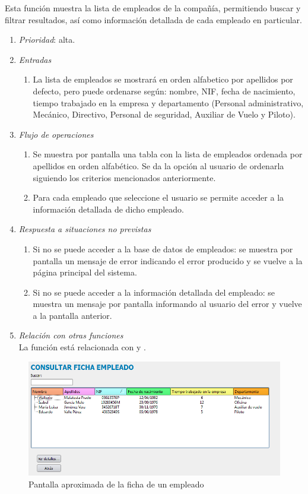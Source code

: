 

 \label{fun:consultarempleado}
	Esta función muestra la lista de empleados de la compañía, permitiendo buscar y filtrar resultados, así como información detallada de cada empleado en particular.
		
	\begin{enumerate}
		\item \textit{Prioridad}: alta.
		\item \textit{Entradas}
			\begin{enumerate}
				\item La lista de empleados se mostrará en orden alfabetico por apellidos por defecto, pero puede ordenarse según: nombre, NIF, fecha de nacimiento, tiempo trabajado en la empresa y departamento (Personal administrativo, Mecánico, Directivo, Personal de seguridad, Auxiliar de Vuelo y Piloto).							
			\end{enumerate}
		\item \textit{Flujo de operaciones}
			\begin{enumerate}
				\item Se muestra por pantalla una tabla con la lista de empleados ordenada por apellidos en orden alfabético. Se da la opción al usuario de ordenarla siguiendo los criterios mencionados anteriormente.
				\item Para cada empleado que seleccione el usuario se permite acceder a la información detallada de dicho empleado.
			\end{enumerate}
		\item \textit{Respuesta a situaciones no previstas}
			\begin{enumerate}
				\item Si no se puede acceder a la base de datos de empleados: se muestra por pantalla un mensaje de error indicando el error producido y se vuelve a la página principal del sistema.
				\item Si no se puede acceder a la información detallada del empleado: se muestra un mensaje por pantalla informando al usuario del error y vuelve a la pantalla anterior.
			\end{enumerate}
		\item \textit{Relación con otras funciones}\\
		La función está relacionada con  y .

	\end{enumerate}
	\begin{figure}[ht]\centering
	\includegraphics[scale=.6]{imagenes/consultarFichaEmpleadoImagen.png}
	\caption{Pantalla aproximada de la ficha de un empleado}
\end{figure}
								
